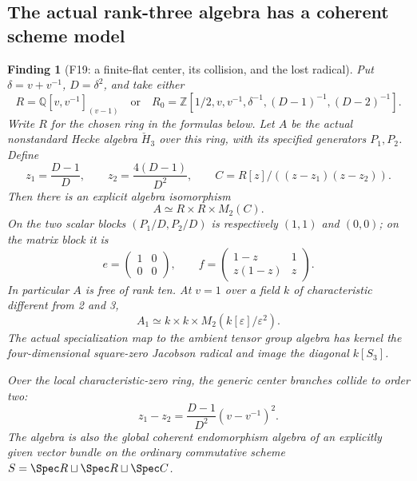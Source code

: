 \documentclass[11pt,a4paper]{article}
\newcommand{\Q}{\mathbb Q}\newcommand{\Z}{\mathbb Z}\newcommand{\C}{\mathbb C}\newcommand{\N}{\mathbb N}\newcommand{\F}{\mathbb F}
\newcommand{\fid}[1]{\textsf{#1}}\newcommand{\gate}[1]{\textsf{#1}}
\theoremstyle{named}\newtheorem{finding}{Finding}[section]
\theoremstyle{definition}\newtheorem{definition}[finding]{Definition}
\theoremstyle{remark}\newtheorem{remark}[finding]{Remark}
\begin{document}
\subsection{The actual rank-three algebra has a coherent scheme model}
\begin{finding}[\fid{F19}: a finite-flat center, its collision, and the lost radical]\label{f:rankthree}
Put $\delta=v+v^{-1}$, $D=\delta^2$, and take either
\[
 R=\Q[v,v^{-1}]_{(v-1)}
 \quad\text{or}\quad
 R_0=\Z[1/2,v,v^{-1},\delta^{-1},(D-1)^{-1},(D-2)^{-1}].
\]
Write $R$ for the chosen ring in the formulas below. Let $A$ be the actual nonstandard Hecke algebra $\check H_3$ over this ring, with its specified generators $P_1,P_2$. Define
\[
 z_1=\frac{D-1}{D},\qquad z_2=\frac{4(D-1)}{D^2},\qquad
 C=R[z]/((z-z_1)(z-z_2)).
\]
Then there is an explicit algebra isomorphism
\begin{equation}\label{eq:r3model}
 A\simeq R\times R\times M_2(C).
\end{equation}
On the two scalar blocks $(P_1/D,P_2/D)$ is respectively $(1,1)$ and $(0,0)$; on the matrix block it is
\[
 e=\begin{pmatrix}1&0\\0&0\end{pmatrix},\qquad
 f=\begin{pmatrix}1-z&1\\z(1-z)&z\end{pmatrix}.
\]
In particular $A$ is free of rank ten. At $v=1$ over a field $k$ of characteristic different from 2 and 3,
\[
 A_1\simeq k\times k\times M_2(k[\varepsilon]/\varepsilon^2).
\]
The actual specialization map to the ambient tensor group algebra has kernel the four-dimensional square-zero Jacobson radical and image the diagonal $k[S_3]$.

Over the local characteristic-zero ring, the generic center branches collide to order two:
\begin{equation}\label{eq:r3collision}
 z_1-z_2=\frac{D-1}{D^2}(v-v^{-1})^2.
\end{equation}
The algebra is also the global coherent endomorphism algebra of an explicitly given vector bundle on the ordinary commutative scheme
$S=\Spec R\sqcup\Spec R\sqcup\Spec C$.
\end{finding}
\end{document}
